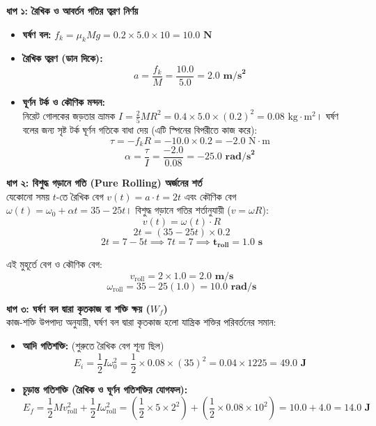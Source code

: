 \documentclass[12pt, a4paper]{article}
\begin{document}
\begin{tcolorbox}[solutionbox={সমাধান (Solution)}]
\begin{center}
\begin{tikzpicture}[>=Stealth, scale=1.2, text=black]
\end{tikzpicture}
\end{center}
\vspace{1em}

\vspace{0.5em}
\noindent
\textbf{ধাপ ১: রৈখিক ও আবর্তন গতির ত্বরণ নির্ণয়} \\
\begin{itemize}[leftmargin=*, parsep=0.4ex]
    \item \textbf{ঘর্ষণ বল:} $f_k = \mu_k M g = 0.2 \times 5.0 \times 10 = \mathbf{10.0\text{ N}}$
    \item \textbf{রৈখিক ত্বরণ (ডান দিকে):}
    $$a = \frac{f_k}{M} = \frac{10.0}{5.0} = \mathbf{2.0\text{ m/s}^2}$$
    \item \textbf{ঘূর্ণন টর্ক ও কৌণিক মন্দন:} \\
    নিরেট গোলকের জড়তার ভ্রামক $I = \frac{2}{5} M R^2 = 0.4 \times 5.0 \times (0.2)^2 = 0.08\text{ kg}\cdot\text{m}^2$। 
    ঘর্ষণ বলের জন্য সৃষ্ট টর্ক ঘূর্ণন গতিকে বাধা দেয় (এটি স্পিনের বিপরীতে কাজ করে):
    $$\tau = -f_k R = -10.0 \times 0.2 = -2.0\text{ N}\cdot\text{m}$$ 
    $$\alpha = \frac{\tau}{I} = \frac{-2.0}{0.08} = \mathbf{-25.0\text{ rad/s}^2}$$
\end{itemize}

\vspace{0.5em}
\noindent
\textbf{ধাপ ২: বিশুদ্ধ গড়ানে গতি (Pure Rolling) অর্জনের শর্ত} \\
যেকোনো সময় $t$-তে রৈখিক বেগ $v(t) = a \cdot t = 2t$ এবং কৌণিক বেগ $\omega(t) = \omega_0 + \alpha t = 35 - 25t$। 
বিশুদ্ধ গড়ানে গতির শর্তানুযায়ী ($v = \omega R$):
$$v(t) = \omega(t) \cdot R$$ 
$$2t = (35 - 25t) \times 0.2$$ 
$$2t = 7 - 5t \implies 7t = 7 \implies \mathbf{t_{\text{roll}} = 1.0\text{ s}}$$

এই মুহূর্তে বেগ ও কৌণিক বেগ:
$$v_{\text{roll}} = 2 \times 1.0 = \mathbf{2.0\text{ m/s}}$$ 
$$\omega_{\text{roll}} = 35 - 25(1.0) = \mathbf{10.0\text{ rad/s}}$$

\vspace{0.5em}
\noindent
\textbf{ধাপ ৩: ঘর্ষণ বল দ্বারা কৃতকাজ বা শক্তি ক্ষয় ($W_f$)} \\
কাজ-শক্তি উপপাদ্য অনুযায়ী, ঘর্ষণ বল দ্বারা কৃতকাজ হলো যান্ত্রিক শক্তির পরিবর্তনের সমান:
\begin{itemize}[leftmargin=*, parsep=0.4ex]
    \item \textbf{আদি গতিশক্তি:} (শুরুতে রৈখিক বেগ শূন্য ছিল)
    $$E_i = \frac{1}{2} I \omega_0^2 = \frac{1}{2} \times 0.08 \times (35)^2 = 0.04 \times 1225 = \mathbf{49.0\text{ J}}$$
    \item \textbf{চূড়ান্ত গতিশক্তি (রৈখিক ও ঘূর্ণন গতিশক্তির যোগফল):}
    $$E_f = \frac{1}{2} M v_{\text{roll}}^2 + \frac{1}{2} I \omega_{\text{roll}}^2 = \left(\frac{1}{2} \times 5 \times 2^2\right) + \left(\frac{1}{2} \times 0.08 \times 10^2\right) = 10.0 + 4.0 = \mathbf{14.0\text{ J}}$$
\end{itemize}


\end{tcolorbox}
\end{document}
